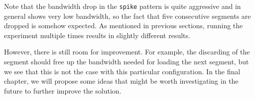Note that the bandwidth drop in the \texttt{spike} pattern is quite aggressive and in general shows very low bandwidth, so the fact that five consecutive segments are dropped is somehow expected. As mentioned in previous sections, running the experiment multiple times results in slightly different results.

However, there is still room for improvement. For example, the discarding of the segment should free up the bandwidth needed for loading the next segment, but we see that this is not the case with this particular configuration. In the final chapter, we will propose some ideas that might be worth investigating in the future to further improve the solution.


